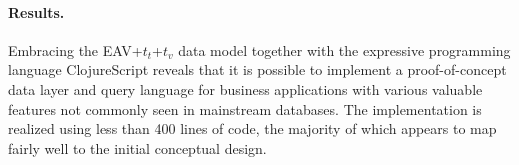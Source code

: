\paragraph{Results.}
Embracing the EAV+$t_t$+$t_v$ data model together with the expressive programming language ClojureScript \cite{hickey2008clojure} reveals that it is possible to implement a proof-of-concept data layer and query language for business applications with various valuable features not commonly seen in mainstream databases. The implementation is realized using less than 400 lines of code, the majority of which appears to map fairly well to the initial conceptual design.
